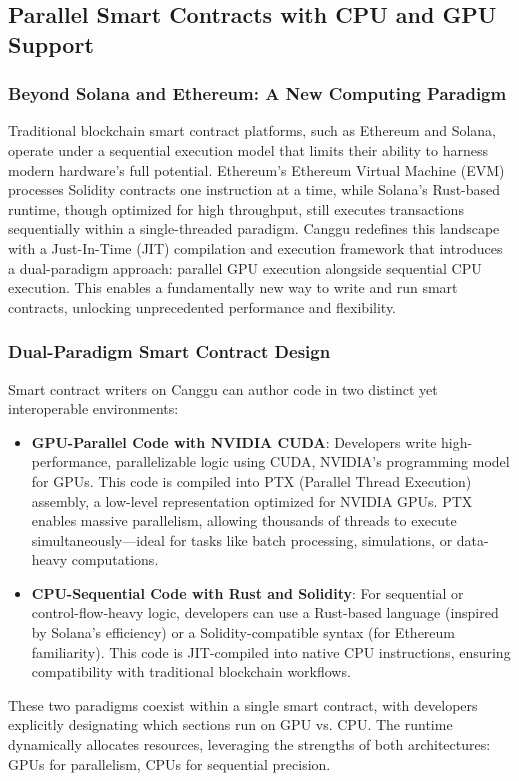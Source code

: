 \documentclass[12pt]{article}
\begin{document}
\subsection{Parallel Smart Contracts with CPU and GPU Support}
\subsubsection{Beyond Solana and Ethereum: A New Computing Paradigm}
\begin{justify}
Traditional blockchain smart contract platforms, such as Ethereum and Solana, operate under a sequential execution model that limits their ability to harness modern hardware’s full potential. Ethereum’s Ethereum Virtual Machine (EVM) processes Solidity contracts one instruction at a time, while Solana’s Rust-based runtime, though optimized for high throughput, still executes transactions sequentially within a single-threaded paradigm. Canggu redefines this landscape with a Just-In-Time (JIT) compilation and execution framework that introduces a dual-paradigm approach: parallel GPU execution alongside sequential CPU execution. This enables a fundamentally new way to write and run smart contracts, unlocking unprecedented performance and flexibility.
\end{justify}

\subsubsection{Dual-Paradigm Smart Contract Design}
\begin{justify}
 Smart contract writers on Canggu can author code in two distinct yet interoperable environments:
\begin{itemize}
    \item \textbf{GPU-Parallel Code with NVIDIA CUDA}: Developers write high-performance, parallelizable logic using CUDA, NVIDIA’s programming model for GPUs. This code is compiled into PTX (Parallel Thread Execution) assembly, a low-level representation optimized for NVIDIA GPUs. PTX enables massive parallelism, allowing thousands of threads to execute simultaneously—ideal for tasks like batch processing, simulations, or data-heavy computations.

    \item \textbf{CPU-Sequential Code with Rust and Solidity}: For sequential or control-flow-heavy logic, developers can use a Rust-based language (inspired by Solana’s efficiency) or a Solidity-compatible syntax (for Ethereum familiarity). This code is JIT-compiled into native CPU instructions, ensuring compatibility with traditional blockchain workflows.
\end{itemize}

These two paradigms coexist within a single smart contract, with developers explicitly designating which sections run on GPU vs. CPU. The runtime dynamically allocates resources, leveraging the strengths of both architectures: GPUs for parallelism, CPUs for sequential precision.

\end{justify}
\end{document}
